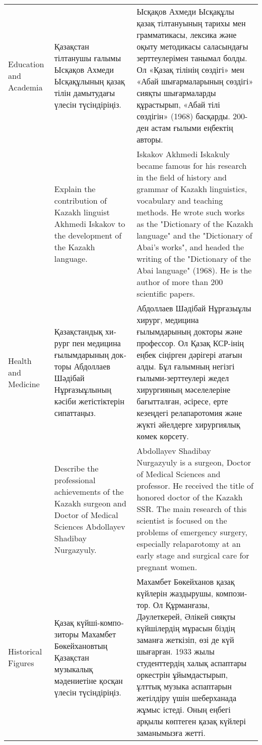 \begin{table*}[b!]
{\begin{tabular}{p{}p{}p{}}
\midrule
Education and Academia & \foreignlanguage{russian}{Қазақстан тілтанушы ғалымы Ысқақов Ахмеди Ысқақұлының қазақ тілін дамытудағы үлесін түсіндіріңіз.} & \foreignlanguage{russian}{Ысқақов Ахмеди Ысқақұлы қазақ тілтануының тарихы мен грамматикасы, лексика және оқыту методикасы саласындағы зерттеулерімен танымал болды. Ол «Қазақ тілінің сөздігі» мен «Абай шығармаларының сөздігі» сияқты шығармаларды құрастырып, «Абай тілі сөздігін» (1968) басқарды. 200-ден астам ғылыми еңбектің авторы.} \\
 & Explain the contribution of Kazakh linguist Akhmedi Iskakov to the development of the Kazakh language. & Iskakov Akhmedi Iskakuly became famous for his research in the field of history and grammar of Kazakh linguistics, vocabulary and teaching methods. He wrote such works as the "Dictionary of the Kazakh language" and the "Dictionary of Abai's works", and headed the writing of the "Dictionary of the Abai language" (1968). He is the author of more than 200 scientific papers.  \\ 
\midrule
Health and Medicine & \foreignlanguage{russian}{Қазақстандық хирург пен медицина ғылымдарының докторы Абдоллаев Шәдібай Нұрғазыұлының кәсіби жетістіктерін сипаттаңыз.} & \foreignlanguage{russian}{Абдоллаев Шәдібай Нұрғазыұлы хирург, медицина ғылымдарының докторы және профессор. Ол Қазақ КСР-інің еңбек сіңірген дәрігері атағын алды. Бұл ғалымның негізгі ғылыми-зерттеулері жедел хирургияның мәселелеріне бағытталған, әсіресе, ерте кезеңдегі релапаротомия және жүкті әйелдерге хирургиялық көмек көрсету.} \\
 & Describe the professional achievements of the Kazakh surgeon and Doctor of Medical Sciences Abdollayev Shadibay Nurgazyuly. & Abdollayev Shadibay Nurgazyuly is a surgeon, Doctor of Medical Sciences and professor. He received the title of honored doctor of the Kazakh SSR. The main research of this scientist is focused on the problems of emergency surgery, especially relaparotomy at an early stage and surgical care for pregnant women.  \\ 
\midrule
Historical Figures & \foreignlanguage{russian}{Қазақ күйші-композиторы Махамбет Бөкейхановтың Қазақстан музыкалық мәдениетіне қосқан үлесін түсіндіріңіз.} & \foreignlanguage{russian}{Махамбет Бөкейханов қазақ күйлерін жаздырушы, композитор. Ол Құрманғазы, Дәулеткерей, Әлікей сияқты күйшілердің мұрасын біздің заманға жеткізіп, өзі де күй шығарған. 1933 жылы студенттердің халық аспаптары оркестрін ұйымдастырып, ұлттық музыка аспаптарын жетілдіру үшін шеберханада жұмыс істеді. Оның еңбегі арқылы көптеген қазақ күйлері заманымызға жетті.} \\

\end{tabular}}
\end{table*}

